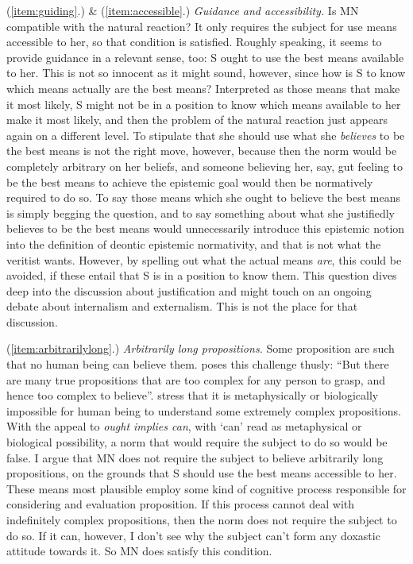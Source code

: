 \documentclass[12pt,numbers=noenddot]{scrartcl}
\begin{document}
(\ref{item:guiding}.) \& (\ref{item:accessible}.) \emph{Guidance and accessibility.}
 Is MN compatible with the natural reaction? It only requires the subject for use means accessible to her, so that condition is satisfied. Roughly speaking, it seems to provide guidance in a relevant sense, too: S ought to use the best means available to her. This is not so innocent as it might sound, however, since how is S to know which means actually are the best means? Interpreted as those means that make it most likely, S might not be in a position to know which means available to her make it most likely, and then the problem of the natural reaction just appears again on a different level. To stipulate that she should use what she \emph{believes} to be the best means is not the right move, however, because then the norm would be completely arbitrary on her beliefs, and someone believing her, say, gut feeling to be the best means to achieve the epistemic goal would then be normatively required to do so. To say those means which she ought to believe the best means is simply begging the question, and to say something about what she justifiedly believes to be the best means would unnecessarily introduce this epistemic notion into the definition of deontic epistemic normativity, and that is not what the veritist wants. However, by spelling out what the actual means \emph{are}, this could be avoided, if these entail that S is in a position to know them. This question dives deep into the discussion about justification and might touch on an ongoing debate about internalism and externalism. This is not the place for that discussion.

(\ref{item:arbitrarilylong}.) \emph{Arbitrarily long propositions.} 
Some proposition are such that no human being can believe them. \textcite[12]{Mchugh2012-MCHTTN} poses this challenge thusly: “But there are many true propositions that are too complex for any person to grasp, and hence too complex to believe”. \textcite[279]{Bykvist2007-BYKDTI} stress that it is metaphysically or biologically impossible for human being to understand some extremely complex propositions. With the appeal to \emph{ought implies can}, with ‘can’ read as metaphysical or biological possibility, a norm that would require the subject to do so would be false. I argue that MN does not require the subject to believe arbitrarily long propositions, on the grounds that S should use the best means accessible to her. These means most plausible employ some kind of cognitive process responsible for considering and evaluation proposition. If this process cannot deal with indefinitely complex propositions, then the norm does not require the subject to do so. If it can, however, I don't see why the subject can't form any doxastic attitude towards it. So MN does satisfy this condition.
\end{document}
